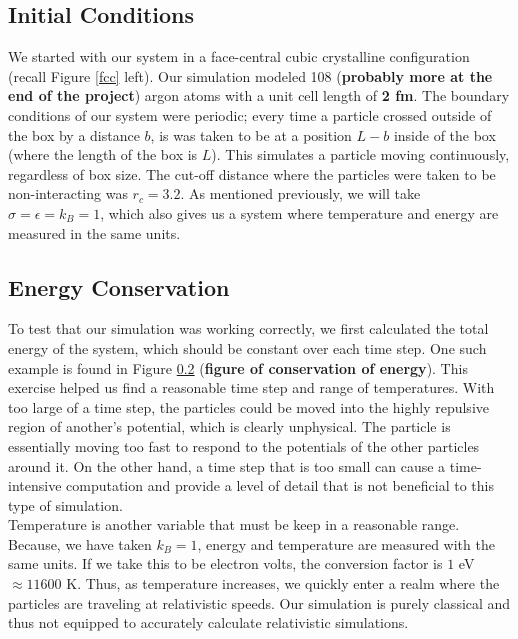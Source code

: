 \documentclass{article}
\begin{document}
\begin{multicols}{2}
\subsection{Initial Conditions}

We started with our system in a face-central cubic crystalline configuration (recall Figure \ref{fcc} left).  Our simulation modeled  108 (\textbf{probably more at the end of the project}) argon atoms with a unit cell length of \textbf{2 fm}.  The boundary conditions of our system were periodic; every time a particle crossed outside of the box by a distance $b$, is was taken to be at a position $L-b$ inside of the box (where the length of the box is $L$).  This simulates a particle moving continuously, regardless of box size.  The cut-off distance where the particles were taken to be non-interacting was $r_c = 3.2$.  As mentioned previously, we will take $\sigma=\epsilon=k_B=1$, which also gives us a system where temperature and energy are measured in the same units.  

\subsection{Energy Conservation}

To test that our simulation was working correctly, we first calculated the total energy of the system, which should be constant over each time step.  One such example is found in Figure \ref{} (\textbf{figure of conservation of energy}).  This exercise helped us find a reasonable time step and range of temperatures.  With too large of a time step, the particles could be moved into the highly repulsive region of another's potential, which is clearly unphysical.  The particle is essentially moving too fast to respond to the potentials of the other particles around it.  On the other hand, a time step that is too small can cause a time-intensive computation and provide a level of detail that is not beneficial to this type of simulation.  \\

Temperature is another variable that must be keep in a reasonable range.  Because, we have taken $k_B =1$, energy and temperature are measured with the same units.  If we take this to be electron volts, the conversion factor is $1 $ eV $\approx 11600$ K.  Thus, as temperature increases, we quickly enter a realm where the particles are traveling at relativistic speeds.  Our simulation is purely classical and thus not equipped to accurately calculate relativistic simulations.


\end{multicols}
\end{document}

